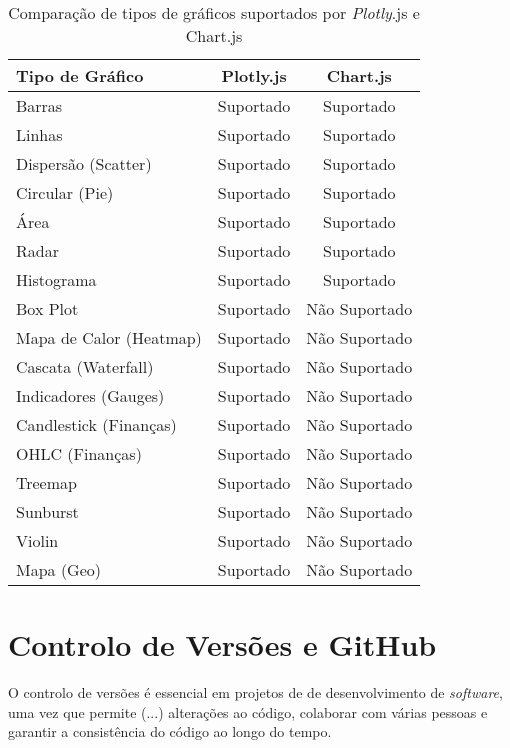 \begin{table}[H]
\centering
\caption{Comparação de tipos de gráficos suportados por \textit{Plotly}.js e Chart.js}
\begin{tabular}{|l|c|c|}
\hline
\textbf{Tipo de Gráfico} & \textbf{Plotly.js} & \textbf{Chart.js} \\
\hline
Barras                         & Suportado & Suportado \\
Linhas                         & Suportado & Suportado \\
Dispersão (Scatter)            & Suportado & Suportado \\
Circular (Pie)                 & Suportado & Suportado \\
Área                           & Suportado & Suportado \\
Radar                          & Suportado & Suportado \\
Histograma                     & Suportado & Suportado \\
Box Plot                       & Suportado & Não Suportado \\
Mapa de Calor (Heatmap)        & Suportado & Não Suportado \\
Cascata (Waterfall)            & Suportado & Não Suportado \\
Indicadores (Gauges)           & Suportado & Não Suportado \\
Candlestick (Finanças)         & Suportado & Não Suportado \\
OHLC (Finanças)                & Suportado & Não Suportado \\
Treemap                        & Suportado & Não Suportado \\
Sunburst                       & Suportado & Não Suportado \\
Violin                         & Suportado & Não Suportado \\
Mapa (Geo)                     & Suportado & Não Suportado \\
\hline
\end{tabular}
\label{tab:charts}
\end{table}

\chapter{Controlo de Versões e GitHub}

O controlo de versões é essencial em projetos de de desenvolvimento de \textit{software}, uma vez que permite (...) alterações ao código, colaborar com várias pessoas e garantir a consistência do código ao longo do tempo.

